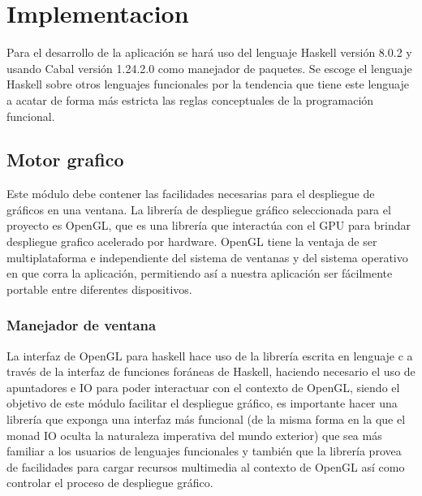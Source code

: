 
\setcounter{secnumdepth}{4}

\chapter{Implementacion}  %

\graphicspath{{implementacion/Figs/Vector/}{implementacion/Figs/}}

Para el desarrollo de la aplicación se hará uso del lenguaje Haskell versión 8.0.2 y usando Cabal versión 1.24.2.0 como manejador de paquetes. Se escoge el lenguaje Haskell sobre otros lenguajes funcionales por la tendencia que tiene este lenguaje a acatar de forma más estricta las reglas conceptuales de la programación funcional.

\section{Motor grafico}

Este módulo debe contener las facilidades necesarias para el despliegue de gráficos en una ventana. La librería de despliegue gráfico seleccionada para el proyecto es OpenGL, que es una librería que interactúa con el GPU para brindar despliegue grafico acelerado por hardware. OpenGL tiene la ventaja de ser multiplataforma e independiente del sistema de ventanas y del sistema operativo en que corra la aplicación, permitiendo así a nuestra aplicación ser fácilmente portable entre diferentes dispositivos.

\subsection{Manejador de ventana}

La interfaz de OpenGL para haskell hace uso de la librería escrita en lenguaje c a través de la interfaz de funciones foráneas de Haskell, haciendo necesario el uso de apuntadores e IO para poder interactuar con el contexto de OpenGL, siendo el objetivo de este módulo facilitar el despliegue gráfico, es importante hacer una librería que exponga una interfaz más funcional (de la misma forma en la que el monad IO oculta la naturaleza imperativa del mundo exterior) que sea más familiar a los usuarios de lenguajes funcionales y también que la librería provea de facilidades para cargar recursos multimedia al contexto de OpenGL así como controlar el proceso de despliegue gráfico.

